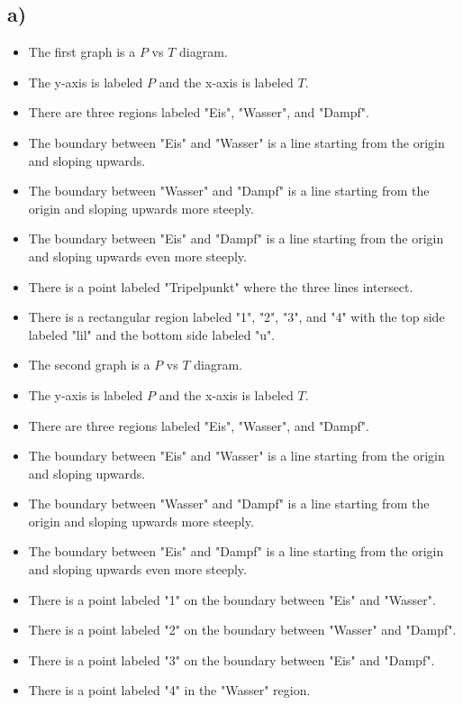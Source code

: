 

\subsection*{a)}

\begin{itemize}
    \item The first graph is a $P$ vs $T$ diagram.
    \item The y-axis is labeled $P$ and the x-axis is labeled $T$.
    \item There are three regions labeled "Eis", "Wasser", and "Dampf".
    \item The boundary between "Eis" and "Wasser" is a line starting from the origin and sloping upwards.
    \item The boundary between "Wasser" and "Dampf" is a line starting from the origin and sloping upwards more steeply.
    \item The boundary between "Eis" and "Dampf" is a line starting from the origin and sloping upwards even more steeply.
    \item There is a point labeled "Tripelpunkt" where the three lines intersect.
    \item There is a rectangular region labeled "1", "2", "3", and "4" with the top side labeled "lil" and the bottom side labeled "u".
\end{itemize}

\begin{itemize}
    \item The second graph is a $P$ vs $T$ diagram.
    \item The y-axis is labeled $P$ and the x-axis is labeled $T$.
    \item There are three regions labeled "Eis", "Wasser", and "Dampf".
    \item The boundary between "Eis" and "Wasser" is a line starting from the origin and sloping upwards.
    \item The boundary between "Wasser" and "Dampf" is a line starting from the origin and sloping upwards more steeply.
    \item The boundary between "Eis" and "Dampf" is a line starting from the origin and sloping upwards even more steeply.
    \item There is a point labeled "1" on the boundary between "Eis" and "Wasser".
    \item There is a point labeled "2" on the boundary between "Wasser" and "Dampf".
    \item There is a point labeled "3" on the boundary between "Eis" and "Dampf".
    \item There is a point labeled "4" in the "Wasser" region.
\end{itemize}